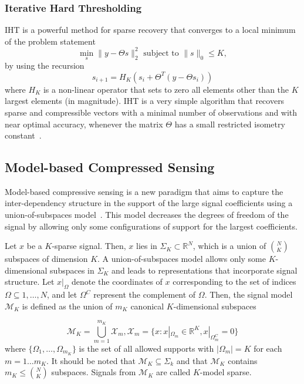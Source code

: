 \documentclass[journal]{IEEEtran}
\begin{document}
 \subsubsection{Iterative Hard Thresholding}
IHT is a powerful method for sparse recovery that converges to a local minimum of the problem statement
\begin{equation}\label{eqIHT}
\min_{s} \|y-\Theta s\|_{2}^{2} \text{ subject to } \|s\|_{0}\leq K,
\end{equation}
by using the recursion
 \begin{equation}\label{BPD}
s_{i+1}=H_{K}(s_{i}+\Theta^T(y-\Theta s_{i}))
\end{equation}
where $H_{K}$ is a non-linear operator that sets to zero all elements other than the $K$ largest elements (in magnitude).
IHT is a very simple algorithm that recovers sparse and compressible vectors with a minimal number of observations and with near optimal accuracy, whenever the matrix $\Theta$ has a small restricted isometry constant~\cite{Blum09}.
 \subsection{Model-based Compressed Sensing}
Model-based compressive sensing is a new paradigm that aims to capture the inter-dependency structure in the support of the large signal coefficients using a union-of-subspaces model~\cite{Bara10}. This model decreases the degrees of freedom of the signal by allowing only some configurations of support for the largest coefficients.

Let $x$ be a $K$-sparse signal. Then, $x$ lies in $\Sigma_K\subset \mathbb{R}^N$, which is a union of $\binom{N}{K}$ subspaces of dimension $K$. A union-of-subspaces model allows only some $K$-dimensional subspaces in $\Sigma_K$ and leads to representations that incorporate signal structure. Let $x|_\Omega$ denote the coordinates of $x$ corresponding to the set of indices $\Omega \subseteq {1, \ldots, N}$, and let $\Omega^C$ represent the complement of $\Omega$. Then, the signal model $ \mathcal{M}_K$ is defined as the union of $m_K$ canonical $K$-dimensional subspaces

\begin{equation}
    \mathcal{M}_K=\bigcup_{m=1}^{m_K} \mathcal{X}_m,    \mathcal{X}_m=\{x: x|_{\Omega_m} \in \mathbb{R}^K, x|_{\Omega_m^C}=0\}
\end{equation}
where $\{\Omega_1, \ldots, \Omega_{m_K}\}$ is the set of all allowed supports with $|\Omega_{m}|=K$ for each $m=1\ldots m_K$. It should be noted that $\mathcal{M}_K\subseteq \Sigma_k$ and that $\mathcal{M}_K$ contains $m_K\leq \binom{N}{K}$ subspaces. Signals from $\mathcal{M}_K$ are called $K$-model sparse.
\end{document}
